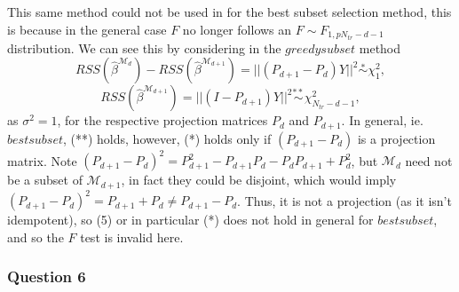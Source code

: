 \documentclass{article}
\begin{document}
This same method could not be used in for the best subset selection method, this is because in the general case $F$ no longer follows an $F \sim F_{1,p N_{tr}-d-1}$ distribution. We can see this by considering in the $greedysubset$ method
\begin{equation}
RSS(\hat{\beta}^{\mathcal{M}_d}) - RSS(\hat{\beta}^{\mathcal{M}_{d+1}})= ||(P_{d+1}-P_d)Y||^2 \overset{*}{\sim} \chi^2_1, 
\end{equation}
\begin{equation}
RSS(\hat{\beta}^{\mathcal{M}_{d+1}}) = ||(I-P_{d+1})Y||^2 \overset{**}{\sim} \chi^2_{N_{tr}-d-1},
\end{equation}
as $\sigma^2=1$, for the respective projection matrices $P_d$ and $P_{d+1}$. In general, ie. $bestsubset$, (**) holds, however, (*) holds only if $(P_{d+1}-P_d)$ is a projection matrix. Note $(P_{d+1}-P_d)^2=P_{d+1}^2-P_{d+1}P_{d}-P_{d}P_{d+1}+P_{d}^2$, but $\mathcal{M}_{d}$ need not be a subset of $\mathcal{M}_{d+1}$, in fact they could be disjoint, which would imply $(P_{d+1}-P_d)^2=P_{d+1}+P_d \ne P_{d+1}-P_d$. Thus, it is not a projection (as it isn't idempotent), so (5) or in particular (*) does not hold in general for $bestsubset$, and so the $F$ test is invalid here.

\vspace{-0.5cm}
\subsubsection{Question 6}
\vspace{-0.5cm}
\end{document}

